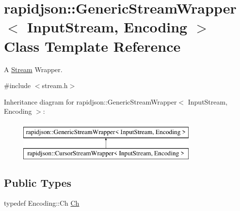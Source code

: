 \hypertarget{classrapidjson_1_1_generic_stream_wrapper}{}\section{rapidjson\+::Generic\+Stream\+Wrapper$<$ Input\+Stream, Encoding $>$ Class Template Reference}
\label{classrapidjson_1_1_generic_stream_wrapper}


A \mbox{\hyperlink{classrapidjson_1_1_stream}{Stream}} Wrapper.  




{\ttfamily \#include $<$stream.\+h$>$}

Inheritance diagram for rapidjson\+::Generic\+Stream\+Wrapper$<$ Input\+Stream, Encoding $>$\+:\begin{figure}[H]
\begin{center}
\leavevmode
\includegraphics[height=2.000000cm]{classrapidjson_1_1_generic_stream_wrapper}
\end{center}
\end{figure}
\subsection*{Public Types}
\begin{DoxyCompactItemize}
\item 
typedef Encoding\+::\+Ch \mbox{\hyperlink{classrapidjson_1_1_generic_stream_wrapper_ac07ed61df8db2bd4a5e713e613b06bdb}{Ch}}
\end{DoxyCompactItemize}
